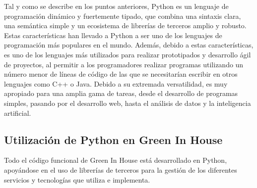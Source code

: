 Tal y como se describe en los puntos anteriores, Python es un lenguaje de programación dinámico y fuertemente tipado, que combina una sintaxis clara, una semántica simple y un ecosistema de librerías de terceros amplio y robusto. Estas características han llevado a Python a ser uno de los lenguajes de programación más populares en el mundo. Además, debido a estas características, es uno de los lenguajes más utilizados para realizar prototipados y desarrollo ágil de proyectos, al permitir a los programadores realizar programas utilizando un número menor de líneas de código de las que se necesitarían escribir en otros lenguajes como C++ o Java. Debido a su extremada versatilidad, es muy apropiado para una amplia gama de tareas, desde el desarrollo de programas simples, pasando por el desarrollo web, hasta el análisis de datos y la inteligencia artificial.

    \subsection{Utilización de Python en Green In House}
    Todo el código funcional de Green In House está desarrollado en Python, apoyándose en el uso de librerías de terceros para la gestión de los diferentes servicios y tecnologías que utiliza e implementa.

